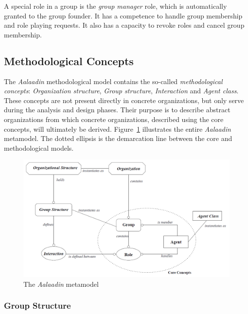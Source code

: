 A special role in a group is the \textit{group manager} role, which is automatically granted to the group founder.
It has a competence to handle group membership and role playing requests.
It also has a capacity to revoke roles and cancel group membership.

\subsection{Methodological Concepts}

The \textit{Aalaadin} methodological model contains the so-called \textit{methodological concepts}: \textit{Organization structure}, \textit{Group structure}, \textit{Interaction} and \textit{Agent class}.
These concepts are not present directly in concrete organizations, but only serve during the analysis and design phases.
Their purpose is to describe abstract organizations from which concrete organizations, described using the core concepts, will ultimately be derived.
Figure~\ref{figure:aalaadin-metamodel} illustrates the entire \textit{Aalaadin} metamodel. The dotted ellipsis is the demarcation line between the core and methodological models.

\begin{figure}[h]
	\centering
	\includegraphics[width=\textwidth]{images/aalaadin/aalaadin-metamodel.png}
	\caption{The \textit{Aalaadin} metamodel \cite{Ferber97}}
	\label{figure:aalaadin-metamodel}
\end{figure}

\subsubsection*{Group Structure}

